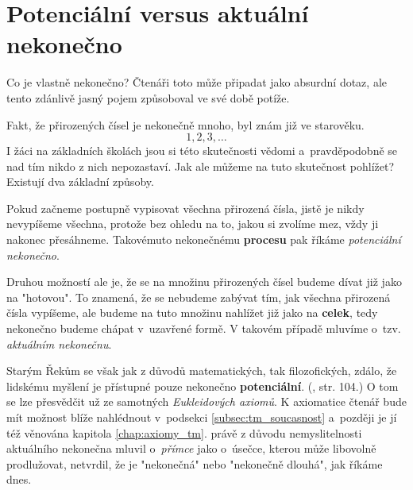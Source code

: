 \section{Potenciální versus aktuální nekonečno}\label{sec:pot_vs_akt_nekonecno}

Co je vlastně nekonečno? Čtenáři toto může připadat jako absurdní dotaz, ale tento zdánlivě jasný pojem způsoboval ve své době potíže.\par
Fakt, že přirozených čísel je nekonečně mnoho, byl znám již ve starověku.
\begin{equation*}
1,2,3,\dots
\end{equation*}
I žáci na základních školách jsou si této skutečnosti vědomi a~pravděpodobně se nad tím nikdo z nich nepozastaví. Jak ale můžeme na tuto skutečnost pohlížet? Existují dva základní způsoby.\par
Pokud začneme postupně vypisovat všechna přirozená čísla, jistě je nikdy nevypíšeme všechna, protože bez ohledu na to, jakou si zvolíme mez, vždy ji nakonec přesáhneme. Takovémuto nekonečnému \textbf{procesu} pak říkáme \emph{potenciální nekonečno}.\par
Druhou možností ale je, že se na množinu přirozených čísel budeme dívat již jako na "hotovou". To znamená, že se nebudeme zabývat tím, jak všechna přirozená čísla vypíšeme, ale budeme na tuto množinu nahlížet již jako na \textbf{celek}, tedy nekonečno budeme chápat v~uzavřené formě. V takovém případě mluvíme o~tzv. \emph{aktuálním nekonečnu}.
\medskip

Starým Řekům se však jak z důvodů matematických, tak filozofických, zdálo, že lidskému myšlení je přístupné pouze nekonečno \textbf{potenciální}. (\cite{Fuchs2003}, str. 104.) O tom se lze přesvědčit už ze samotných \emph{Eukleidových axiomů}. K axiomatice čtenář bude mít možnost blíže nahlédnout v~podsekci \ref{subsec:tm_soucasnost} a~později je jí též věnována kapitola \ref{chap:axiomy_tm}.  právě z důvodu nemyslitelnosti aktuálního nekonečna mluvil o~\emph{přímce} jako o~úsečce, kterou může libovolně prodlužovat, netvrdil, že je "nekonečná" nebo "nekonečně dlouhá", jak říkáme dnes.


